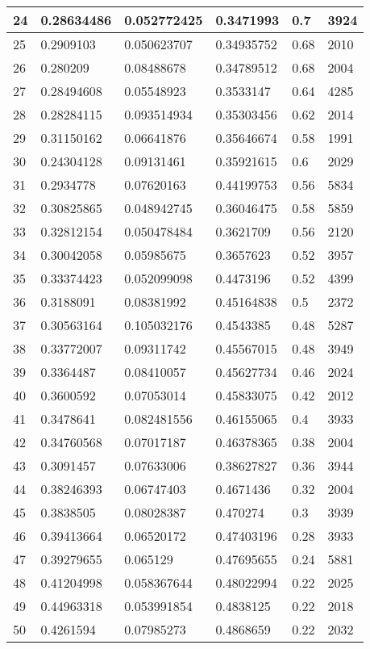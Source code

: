 \begin{longtable}{|l|l|l|l|l|l|}
24 & 0.28634486 & 0.052772425 & 0.3471993 & 0.7 & 3924 \\ \hline 
25 & 0.2909103 & 0.050623707 & 0.34935752 & 0.68 & 2010 \\ \hline 
26 & 0.280209 & 0.08488678 & 0.34789512 & 0.68 & 2004 \\ \hline 
27 & 0.28494608 & 0.05548923 & 0.3533147 & 0.64 & 4285 \\ \hline 
28 & 0.28284115 & 0.093514934 & 0.35303456 & 0.62 & 2014 \\ \hline 
29 & 0.31150162 & 0.06641876 & 0.35646674 & 0.58 & 1991 \\ \hline 
30 & 0.24304128 & 0.09131461 & 0.35921615 & 0.6 & 2029 \\ \hline 
31 & 0.2934778 & 0.07620163 & 0.44199753 & 0.56 & 5834 \\ \hline 
32 & 0.30825865 & 0.048942745 & 0.36046475 & 0.58 & 5859 \\ \hline 
33 & 0.32812154 & 0.050478484 & 0.3621709 & 0.56 & 2120 \\ \hline 
34 & 0.30042058 & 0.05985675 & 0.3657623 & 0.52 & 3957 \\ \hline 
35 & 0.33374423 & 0.052099098 & 0.4473196 & 0.52 & 4399 \\ \hline 
36 & 0.3188091 & 0.08381992 & 0.45164838 & 0.5 & 2372 \\ \hline 
37 & 0.30563164 & 0.105032176 & 0.4543385 & 0.48 & 5287 \\ \hline 
38 & 0.33772007 & 0.09311742 & 0.45567015 & 0.48 & 3949 \\ \hline 
39 & 0.3364487 & 0.08410057 & 0.45627734 & 0.46 & 2024 \\ \hline 
40 & 0.3600592 & 0.07053014 & 0.45833075 & 0.42 & 2012 \\ \hline 
41 & 0.3478641 & 0.082481556 & 0.46155065 & 0.4 & 3933 \\ \hline 
42 & 0.34760568 & 0.07017187 & 0.46378365 & 0.38 & 2004 \\ \hline 
43 & 0.3091457 & 0.07633006 & 0.38627827 & 0.36 & 3944 \\ \hline 
44 & 0.38246393 & 0.06747403 & 0.4671436 & 0.32 & 2004 \\ \hline 
45 & 0.3838505 & 0.08028387 & 0.470274 & 0.3 & 3939 \\ \hline 
46 & 0.39413664 & 0.06520172 & 0.47403196 & 0.28 & 3933 \\ \hline 
47 & 0.39279655 & 0.065129 & 0.47695655 & 0.24 & 5881 \\ \hline 
48 & 0.41204998 & 0.058367644 & 0.48022994 & 0.22 & 2025 \\ \hline 
49 & 0.44963318 & 0.053991854 & 0.4838125 & 0.22 & 2018 \\ \hline 
50 & 0.4261594 & 0.07985273 & 0.4868659 & 0.22 & 2032 \\ \hline 
\end{longtable}